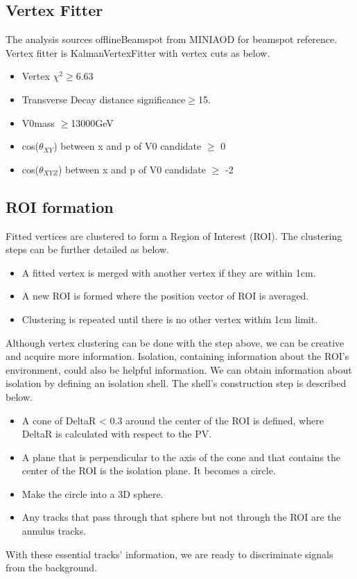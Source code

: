 \subsection{Vertex Fitter}\label{sec:ROI_V0Fitter}

The analysis sources offlineBeamspot from MINIAOD for beamspot reference.
Vertex fitter is KalmanVertexFitter with vertex cuts as below.
\begin{itemize}
  \item Vertex $\chi^{2}\geq$6.63 
  \item Transverse Decay distance significance$\geq$15.
  \item V0mass $\geq$13000GeV
  \item cos($\theta_{XY}$) between x and p of V0 candidate $\geq$ 0
  \item cos($\theta_{XYZ}$) between x and p of V0 candidate $\geq$ -2
\end{itemize}

\subsection{ROI formation}\label{sec:ROI_ROIformation}
Fitted vertices are clustered to form a Region of Interest (ROI).
The clustering steps can be further detailed as below.
\begin{itemize}
  \item A fitted vertex is merged with another vertex if they are within 1cm. 
  \item A new ROI is formed where the position vector of ROI is averaged.
  \item Clustering is repeated until there is no other vertex within 1cm limit.
\end{itemize}
Although vertex clustering can be done with the step above, we can be creative and acquire more information.
Isolation, containing information about the ROI's environment, could also be helpful information.
We can obtain information about isolation by defining an isolation shell.
The shell's construction step is described below.
\begin{itemize}
  \item A cone of DeltaR < 0.3 around the center of the ROI is defined, where DeltaR is calculated with respect to the PV.
  \item A plane that is perpendicular to the axis of the cone and that contains the center of the ROI is the isolation plane. It becomes a circle. 
  \item Make the circle into a 3D sphere.
  \item Any tracks that pass through that sphere but not through the ROI are the annulus tracks.
\end{itemize}
With these essential tracks' information, we are ready to discriminate signals from the background.

